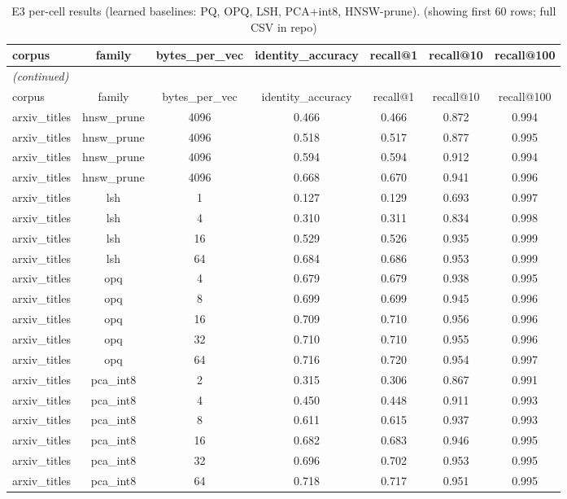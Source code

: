 \begin{longtable}{lcccccc}
\caption{E3 per-cell results (learned baselines: PQ, OPQ, LSH, PCA+int8, HNSW-prune). (showing first 60 rows; full CSV in repo)}\label{tab:supp_e3}\\
\toprule
corpus & family & bytes\_per\_vec & identity\_accuracy & recall@1 & recall@10 & recall@100 \\
\midrule
\endfirsthead
\multicolumn{7}{l}{\small\itshape (continued)}\\
\toprule
corpus & family & bytes\_per\_vec & identity\_accuracy & recall@1 & recall@10 & recall@100 \\
\midrule
\endhead
\bottomrule
\endfoot
arxiv\_titles & hnsw\_prune & 4096 & 0.466 & 0.466 & 0.872 & 0.994 \\
arxiv\_titles & hnsw\_prune & 4096 & 0.518 & 0.517 & 0.877 & 0.995 \\
arxiv\_titles & hnsw\_prune & 4096 & 0.594 & 0.594 & 0.912 & 0.994 \\
arxiv\_titles & hnsw\_prune & 4096 & 0.668 & 0.670 & 0.941 & 0.996 \\
arxiv\_titles & lsh & 1 & 0.127 & 0.129 & 0.693 & 0.997 \\
arxiv\_titles & lsh & 4 & 0.310 & 0.311 & 0.834 & 0.998 \\
arxiv\_titles & lsh & 16 & 0.529 & 0.526 & 0.935 & 0.999 \\
arxiv\_titles & lsh & 64 & 0.684 & 0.686 & 0.953 & 0.999 \\
arxiv\_titles & opq & 4 & 0.679 & 0.679 & 0.938 & 0.995 \\
arxiv\_titles & opq & 8 & 0.699 & 0.699 & 0.945 & 0.996 \\
arxiv\_titles & opq & 16 & 0.709 & 0.710 & 0.956 & 0.996 \\
arxiv\_titles & opq & 32 & 0.710 & 0.710 & 0.955 & 0.996 \\
arxiv\_titles & opq & 64 & 0.716 & 0.720 & 0.954 & 0.997 \\
arxiv\_titles & pca\_int8 & 2 & 0.315 & 0.306 & 0.867 & 0.991 \\
arxiv\_titles & pca\_int8 & 4 & 0.450 & 0.448 & 0.911 & 0.993 \\
arxiv\_titles & pca\_int8 & 8 & 0.611 & 0.615 & 0.937 & 0.993 \\
arxiv\_titles & pca\_int8 & 16 & 0.682 & 0.683 & 0.946 & 0.995 \\
arxiv\_titles & pca\_int8 & 32 & 0.696 & 0.702 & 0.953 & 0.995 \\
arxiv\_titles & pca\_int8 & 64 & 0.718 & 0.717 & 0.951 & 0.995 \\

\end{longtable}
